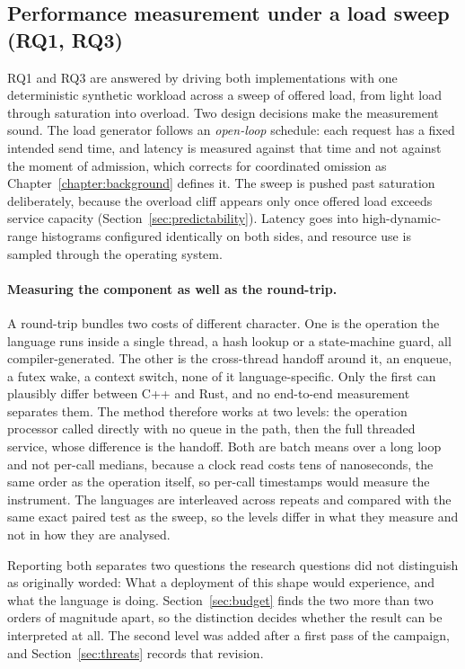 \subsection{Performance measurement under a load sweep (RQ1, RQ3)}\label{sec:methodperf}
RQ1 and RQ3 are answered by driving both implementations with one deterministic synthetic
workload across a sweep of offered load, from light load through saturation into overload. Two
design decisions make the measurement sound. The load generator follows an \emph{open-loop}
schedule: each request has a fixed intended send time, and latency is measured against that time
and not against the moment of admission, which corrects for coordinated omission as
Chapter~\ref{chapter:background} defines it. The sweep is pushed past saturation deliberately,
because the overload cliff appears only once offered load exceeds service capacity
(Section~\ref{sec:predictability}). Latency goes into high-dynamic-range histograms configured
identically on both sides, and resource use is sampled through the operating system.

\paragraph{Measuring the component as well as the round-trip.}
A round-trip bundles two costs of different character. One is the operation the language runs
inside a single thread, a hash lookup or a state-machine guard, all compiler-generated. The
other is the cross-thread handoff around it, an enqueue, a futex wake, a context switch, none of
it language-specific. Only the first can plausibly differ between C++ and Rust, and no
end-to-end measurement separates them. The method therefore works at two levels: the operation
processor called directly with no queue in the path, then the full threaded service, whose
difference is the handoff. Both are batch means over a long loop and not per-call medians,
because a clock read costs tens of nanoseconds,
the same order as the operation itself, so per-call timestamps would measure the instrument. The
languages are interleaved across repeats and compared with the same exact paired test as the
sweep, so the levels differ in what they measure and not in how they are analysed.

Reporting both separates two questions the research questions did not distinguish as originally
worded: What a deployment of this shape would experience, and what the language is doing.
Section~\ref{sec:budget} finds the two more than two orders of magnitude apart, so the
distinction decides whether the result can be interpreted at all. The second level was added
after a first pass of the campaign, and Section~\ref{sec:threats} records that revision.

